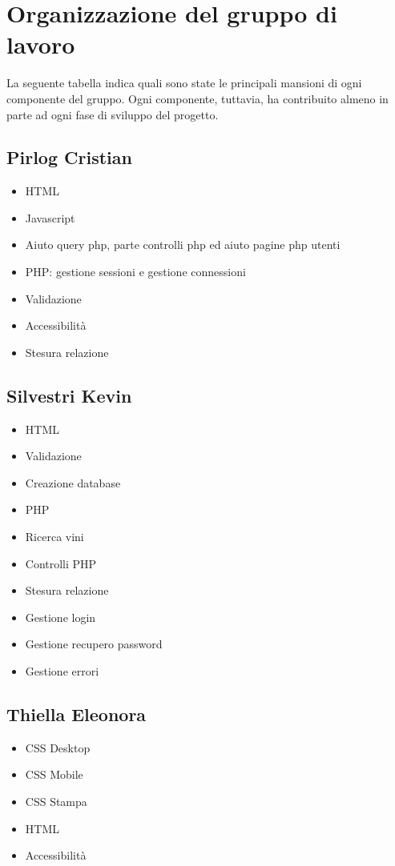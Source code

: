 \section{Organizzazione del gruppo di lavoro}

La seguente tabella indica quali sono state le principali mansioni di ogni componente del gruppo. Ogni componente, tuttavia, ha contribuito almeno in parte ad ogni fase di sviluppo del progetto.

\subsection{Pirlog Cristian}

\begin{itemize}
	\item HTML
	\item Javascript
	\item Aiuto query php, parte controlli php ed aiuto pagine php utenti
	\item PHP: gestione sessioni e gestione connessioni
	\item Validazione
	\item Accessibilità
	\item Stesura relazione
\end{itemize}

\subsection{Silvestri Kevin}

\begin{itemize}
	\item HTML
	\item Validazione
	\item Creazione database
	\item PHP
	\item Ricerca vini
	\item Controlli PHP
	\item Stesura relazione
	\item Gestione login
	\item Gestione recupero password
	\item Gestione errori
\end{itemize}

\subsection{Thiella Eleonora}

\begin{itemize}
	\item CSS Desktop
	\item CSS Mobile
	\item CSS Stampa
	\item HTML
	\item Accessibilità
\end{itemize}

